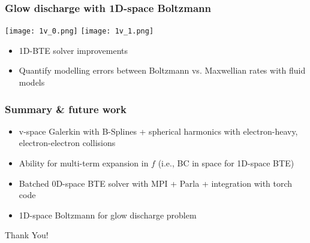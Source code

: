 \documentclass[mathserif, aspectratio=169]{beamer}
\begin{document}
\begin{frame}
	\frametitle{Glow discharge with 1D-space Boltzmann}
	\begin{center}
		\texttt{[image: 1v\_0.png]}
		\texttt{[image: 1v\_1.png]}
	\end{center}
	\begin{itemize}
		\item 1D-BTE solver improvements
		\item Quantify modelling errors between Boltzmann vs. Maxwellian rates with fluid models
	\end{itemize}

\end{frame}



\begin{frame}
	\frametitle{Summary \& future work}
	\begin{itemize}
		\item v-space Galerkin with B-Splines + spherical harmonics with electron-heavy, electron-electron collisions
		\item Ability for multi-term expansion in $f$ (i.e., BC in space for 1D-space BTE)
		\item Batched 0D-space BTE solver with MPI + Parla + integration with torch code
		\item 1D-space Boltzmann for glow discharge problem
	\end{itemize}
	\pause
	\begin{center}
		Thank You!
	\end{center}
\end{frame}
\end{document}
